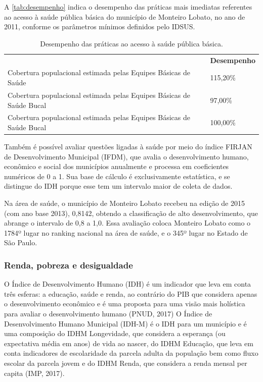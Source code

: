 A \autoref{tab:desempenho} indica o desempenho das práticas mais imediatas referentes ao acesso à saúde pública básica do município de Monteiro Lobato, no ano de 2011, conforme os parâmetros mínimos definidos pelo IDSUS.

\begin{table}[htbp]
	\centering
	\caption{Desempenho das práticas ao acesso à saúde pública básica.}
	\begin{tabular}{P{0.5\textwidth}|P{0.15\textwidth}}
		 & \textcolor[rgb]{ 1,  1,  1}{\textbf{Desempenho}} \\
		 Cobertura populacional estimada pelas Equipes Básicas de Saúde & 115,20\% \\
		 Cobertura populacional estimada pelas Equipes Básicas de Saúde Bucal & 97,00\% \\
		 Cobertura populacional estimada pelas Equipes Básicas de Saúde Bucal & 100,00\% \\
	\end{tabular}%
	\label{tab:desempenho}%
\end{table}%

Também é possível avaliar questões ligadas à saúde por meio do índice FIRJAN de Desenvolvimento Municipal (IFDM), que avalia o desenvolvimento humano, econômico e social dos municípios anualmente e processa em coeficientes numéricos de 0 a 1. Sua base de cálculo é exclusivamente estatística, e se distingue do IDH porque esse tem um intervalo maior de coleta de dados. 		

Na área de saúde, o município de Monteiro Lobato recebeu na edição de 2015 (com ano base 2013), 0,8142, obtendo a classificação de alto desenvolvimento, que abrange o intervalo de 0,8 a 1,0. Essa avaliação coloca Monteiro Lobato como o 1784º lugar no ranking nacional na área de saúde, e o 345º lugar no Estado de São Paulo.

\subsubsection{Renda, pobreza e desigualdade}

O Índice de Desenvolvimento Humano (IDH) é um indicador que leva em conta três esferas: a educação, saúde e renda, ao contrário do PIB que considera apenas o desenvolvimento econômico e é uma proposta para uma visão mais holística para avaliar o desenvolvimento humano (PNUD, 2017) O Índice de Desenvolvimento Humano Municipal (IDH-M) é o IDH para um município e é uma composição do IDHM Longevidade, que considera a esperança (ou expectativa média em anos) de vida ao nascer, do IDHM Educação, que leva em conta indicadores de escolaridade da parcela adulta da população bem como fluxo escolar da parcela jovem e do IDHM Renda, que considera a renda mensal per capita (IMP, 2017).

